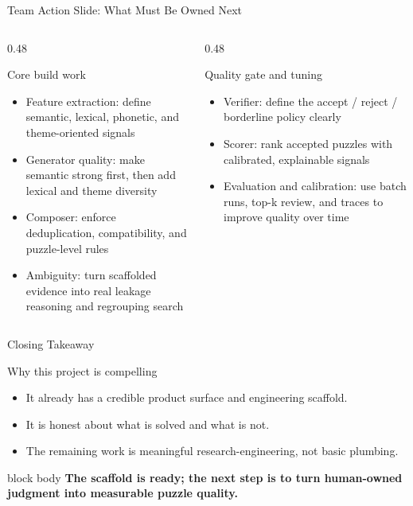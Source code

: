 \documentclass[11pt,aspectratio=169]{beamer}
\newcommand{\KeyMessage}[1]{%
  \begin{beamercolorbox}[wd=\linewidth,rounded=true,sep=8pt]{block body}
    \centering\bfseries #1
  \end{beamercolorbox}
}
\begin{document}
\begin{frame}{Team Action Slide: What Must Be Owned Next}
  \begin{columns}[T,onlytextwidth]
    \begin{column}{0.48\textwidth}
      \begin{block}{Core build work}
        \begin{itemize}
          \item Feature extraction: define semantic, lexical, phonetic, and theme-oriented signals
          \item Generator quality: make semantic strong first, then add lexical and theme diversity
          \item Composer: enforce deduplication, compatibility, and puzzle-level rules
          \item Ambiguity: turn scaffolded evidence into real leakage reasoning and regrouping search
        \end{itemize}
      \end{block}
    \end{column}
    \begin{column}{0.48\textwidth}
      \begin{exampleblock}{Quality gate and tuning}
        \begin{itemize}
          \item Verifier: define the accept / reject / borderline policy clearly
          \item Scorer: rank accepted puzzles with calibrated, explainable signals
          \item Evaluation and calibration: use batch runs, top-k review, and traces to improve quality over time
        \end{itemize}
      \end{exampleblock}
    \end{column}
  \end{columns}
\end{frame}

\begin{frame}{Closing Takeaway}
  \begin{block}{Why this project is compelling}
    \begin{itemize}
      \item It already has a credible product surface and engineering scaffold.
      \item It is honest about what is solved and what is not.
      \item The remaining work is meaningful research-engineering, not basic plumbing.
    \end{itemize}
  \end{block}

  \vspace{0.25cm}
  \KeyMessage{The scaffold is ready; the next step is to turn human-owned judgment into measurable puzzle quality.}
\end{frame}
\end{document}
